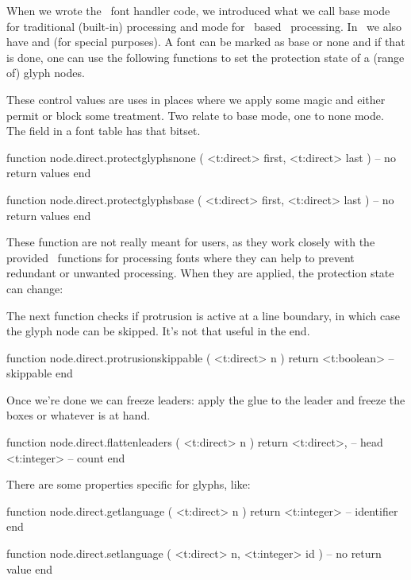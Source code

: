 When we wrote the \LUA\ font handler code, we introduced what we call \quote
{base} mode for traditional (built-in) processing and  mode for
\LUA\ based \OPENTYPE\ processing. In \CONTEXT\ we also have  and
 (for special purposes). A font can be marked as base or none and if
that is done, one can use the following functions to set the protection state of
a (range of) glyph nodes.


These control values are uses in places where we apply some magic and either
permit or block some treatment. Two relate to base mode, one to none mode. The
 field in a font table has that bitset.

\starttyping[option=LUA]
function node.direct.protectglyphsnone ( <t:direct> first, <t:direct> last )
    -- no return values
end

function node.direct.protectglyphsbase ( <t:direct> first, <t:direct> last )
    -- no return values
end
\stoptyping

These function are not really meant for users, as they work closely with the
provided \LUA\ functions for processing fonts where they can help to prevent
redundant or unwanted processing. When they are applied, the protection state
can change:


The next function checks if protrusion is active at a line boundary, in which case the glyph
node can be skipped. It's not that useful in the end.

\starttyping[option=LUA]
function node.direct.protrusionskippable ( <t:direct> n )
    return <t:boolean> -- skippable
end
\stoptyping

Once we're done we can freeze leaders: apply the glue to the leader and freeze
the boxes or whatever is at hand.

\starttyping[option=LUA]
function node.direct.flattenleaders ( <t:direct> n )
    return
        <t:direct>, -- head
        <t:integer> -- count
end
\stoptyping

There are some properties specific for glyphs, like:

\starttyping[option=LUA]
function node.direct.getlanguage ( <t:direct> n )
    return <t:integer> -- identifier
end

function node.direct.setlanguage (
    <t:direct>  n,
    <t:integer> id
)
    -- no return value
end
\stoptyping

